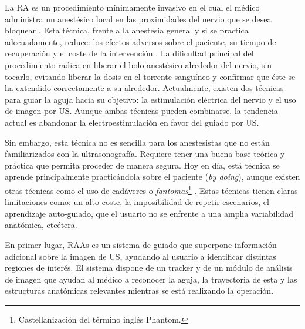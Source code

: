 La \ac{RA} es un procedimiento mínimamente invasivo en el cual el médico administra un anestésico local en las proximidades del nervio que se desea bloquear \cite{CVraisra}. Esta técnica, frente a la anestesia general y si se practica adecuadamente, reduce: los efectos adversos sobre el paciente, su tiempo de recuperación y el coste de la intervención \cite{PMID:26695878}. La dificultad principal del procedimiento radica en liberar el bolo anestésico alrededor del nervio, sin tocarlo, evitando liberar la dosis en el torrente sanguíneo y confirmar que éste se ha extendido correctamente a su alrededor. Actualmente, existen dos técnicas para guiar la aguja hacia su objetivo: la estimulación eléctrica del nervio y el uso de imagen por \ac{US}. Aunque ambas técnicas pueden combinarse, la tendencia actual es abandonar la electroestimulación en favor del guiado por \ac{US}.

Sin embargo, esta técnica no es sencilla para los anestesistas que no están familiarizados con la ultrasonografía. Requiere tener una buena base teórica y práctica que permita proceder de manera segura. Hoy en día, está técnica se aprende principalmente practicándola sobre el paciente (\emph{by doing}), aunque existen otras técnicas como el uso de cadáveres \cite{Tsui2007} o \emph{fantomas}\footnote{Castellanización del término inglés Phantom.} \cite{phantomra}. Estas técnicas tienen claras limitaciones como: un alto coste,
la imposibilidad de repetir escenarios, el aprendizaje auto-guiado, 
que el usuario no se enfrente a una amplia variabilidad anatómica, etcétera.

En primer lugar, \ac{RAAs} es un sistema de guiado que superpone información adicional sobre la imagen de \ac{US}, ayudando al usuario a identificar distintas regiones de interés. El sistema dispone de un \ac{tracker} y de un módulo de análisis de imagen que ayudan al médico a reconocer la aguja, la trayectoria de esta y las estructuras anatómicas relevantes mientras se está realizando la operación. 



